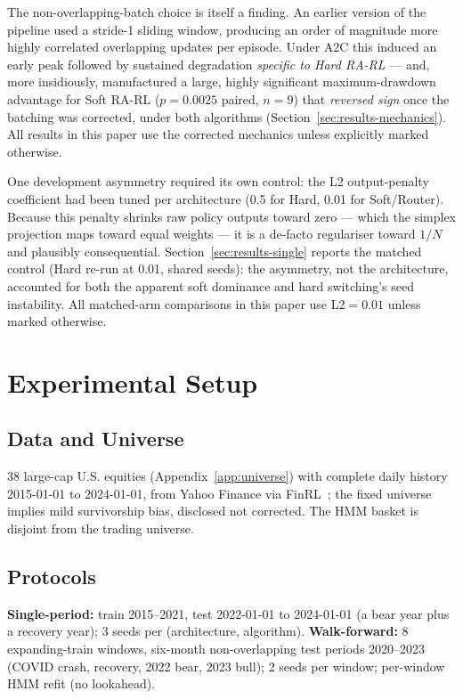 \documentclass[sigconf,anonymous,review]{acmart}
\begin{document}
The non-overlapping-batch choice is itself a finding. An earlier version
of the pipeline used a stride-1 sliding window, producing an order of
magnitude more highly correlated overlapping updates per episode. Under
A2C this induced an early peak followed by sustained degradation
\emph{specific to Hard RA-RL} --- and, more insidiously, manufactured a
large, highly significant maximum-drawdown advantage for Soft RA-RL
($p{=}0.0025$ paired, $n{=}9$) that \emph{reversed sign} once the batching
was corrected, under both algorithms
(Section~\ref{sec:results-mechanics}). All results in this paper use the
corrected mechanics unless explicitly marked otherwise.

One development asymmetry required its own control: the L2
output-penalty coefficient had been tuned per architecture (0.5 for
Hard, 0.01 for Soft/Router). Because this penalty shrinks raw policy
outputs toward zero --- which the simplex projection maps toward equal
weights --- it is a de-facto regulariser toward $1/N$ and plausibly
consequential. Section~\ref{sec:results-single} reports the matched
control (Hard re-run at 0.01, shared seeds): the asymmetry, not the
architecture, accounted for both the apparent soft dominance and hard
switching's seed instability. All matched-arm comparisons in this paper
use L2${=}0.01$ unless marked otherwise.

\section{Experimental Setup}

\subsection{Data and Universe}
38 large-cap U.S. equities (Appendix~\ref{app:universe}) with complete
daily history 2015-01-01 to 2024-01-01, from Yahoo Finance via
FinRL~\cite{liu2020finrl}; the fixed universe implies mild survivorship
bias, disclosed not corrected. The HMM basket is disjoint from the
trading universe.

\subsection{Protocols}
\textbf{Single-period:} train 2015--2021, test 2022-01-01 to 2024-01-01
(a bear year plus a recovery year); 3 seeds per (architecture, algorithm).
\textbf{Walk-forward:} 8 expanding-train windows, six-month non-overlapping
test periods 2020--2023 (COVID crash, recovery, 2022 bear, 2023 bull);
2 seeds per window; per-window HMM refit (no lookahead).
\end{document}

